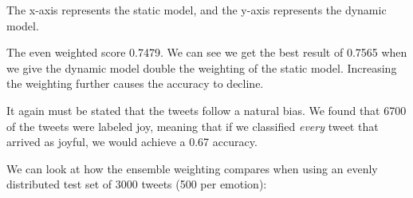 {The x-axis represents the static model, and the y-axis represents the dynamic model.

\begin{table}[H]
\center
{}
\caption{Accuracy scores for 10,000 tweets(database tweets) weighted against different values 0.1 - 1}
\end{table}


The even weighted score 0.7479. We can see we get the best result of 0.7565 when we give the dynamic model double the weighting of the static model. Increasing the weighting further causes the accuracy to decline.

It again must be stated that the tweets follow a natural bias. We found that 6700 of the tweets were labeled joy, meaning that if we classified \textit{every} tweet that arrived as joyful, we would achieve a 0.67 accuracy.

We can look at how the ensemble weighting compares when using an evenly distributed test set of 3000 tweets (500 per emotion):

}
